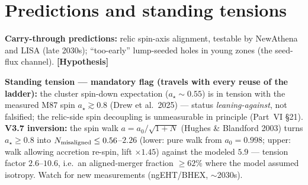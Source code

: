 \documentclass[11pt]{article}
\newcommand{\hyp}{\textcolor{orange!80!black}{\textbf{[Hypothesis]}}}
\begin{document}
\section{Predictions and standing tensions}
\textbf{Carry-through predictions:} relic spin-axis alignment, testable by NewAthena and LISA (late 2030s); ``too-early'' lump-seeded holes in young zones (the seed-flux channel). \hyp

\textbf{Standing tension --- mandatory flag (travels with every reuse of the ladder):} the cluster spin-down expectation ($a_\star\sim0.55$) is in tension with the measured M87 spin $a_\star\gtrsim0.8$ (Drew et al.\ 2025) --- status \emph{leaning-against}, not falsified; the relic-side spin decoupling is unmeasurable in principle (Part~VI \S21). \textbf{V3.7 inversion:} the spin walk $a=a_0/\sqrt{1+N}$ (Hughes \& Blandford 2003) turns $a_\star\ge0.8$ into $N_{\rm misaligned}\le0.56$--$2.26$ (lower: pure walk from $a_0=0.998$; upper: walk allowing accretion re-spin, lift $\times1.45$) against the modeled $5.9$ --- tension factor $2.6$--$10.6$, i.e.\ an aligned-merger fraction $\ge62\%$ where the model assumed isotropy. Watch for new measurements (ngEHT/BHEX, $\sim$2030s).

\end{document}
